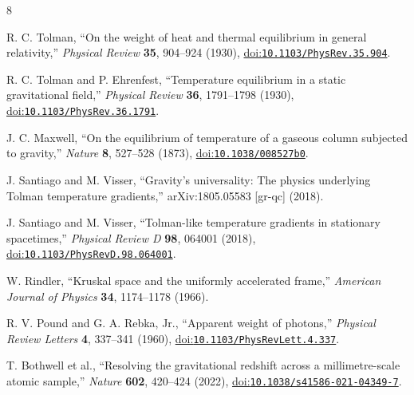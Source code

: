 \documentclass[12pt]{article}
\begin{document}
\begin{thebibliography}{8}
\small
{}
\raggedright
{}

R. C. Tolman,
``On the weight of heat and thermal equilibrium in general relativity,''
\emph{Physical Review} \textbf{35}, 904--924 (1930),
\href{https://doi.org/10.1103/PhysRev.35.904}{doi:\nolinkurl{10.1103/PhysRev.35.904}}.

R. C. Tolman and P. Ehrenfest,
``Temperature equilibrium in a static gravitational field,''
\emph{Physical Review} \textbf{36}, 1791--1798 (1930),
\href{https://doi.org/10.1103/PhysRev.36.1791}{doi:\nolinkurl{10.1103/PhysRev.36.1791}}.

J. C. Maxwell,
``On the equilibrium of temperature of a gaseous column subjected to gravity,''
\emph{Nature} \textbf{8}, 527--528 (1873),
\href{https://doi.org/10.1038/008527b0}{doi:\nolinkurl{10.1038/008527b0}}.

J. Santiago and M. Visser,
``Gravity's universality: The physics underlying Tolman temperature gradients,''
arXiv:1805.05583 [gr-qc] (2018).

J. Santiago and M. Visser,
``Tolman-like temperature gradients in stationary spacetimes,''
\emph{Physical Review D} \textbf{98}, 064001 (2018),
\href{https://doi.org/10.1103/PhysRevD.98.064001}{doi:\nolinkurl{10.1103/PhysRevD.98.064001}}.

W. Rindler,
``Kruskal space and the uniformly accelerated frame,''
\emph{American Journal of Physics} \textbf{34}, 1174--1178 (1966).

R. V. Pound and G. A. Rebka, Jr.,
``Apparent weight of photons,''
\emph{Physical Review Letters} \textbf{4}, 337--341 (1960),
\href{https://doi.org/10.1103/PhysRevLett.4.337}{doi:\nolinkurl{10.1103/PhysRevLett.4.337}}.

T. Bothwell et al.,
``Resolving the gravitational redshift across a millimetre-scale atomic sample,''
\emph{Nature} \textbf{602}, 420--424 (2022),
\href{https://doi.org/10.1038/s41586-021-04349-7}{doi:\nolinkurl{10.1038/s41586-021-04349-7}}.

\end{thebibliography}
\end{document}
